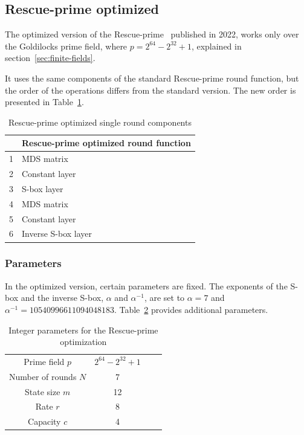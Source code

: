 \subsection*{Rescue-prime optimized}
The optimized version of the Rescue-prime~\cite{ashur2022rescue} published in 2022, works only over the Goldilocks prime field, where $p = 2^{64} - 2^{32} + 1$, explained in section~\ref{sec:finite-fields}.

It uses the same components of the standard Rescue-prime round function, but the order of the operations differs from the standard version. The new order is presented in Table~\ref{tab:rescue-opt-round-comp}. 

\begin{table}[htbp]
    \centering
    \begin{tabular}{rl}
        \toprule
        & Rescue-prime optimized round function \\
        \midrule
        1 & MDS matrix \\
        2 & Constant layer \\
        3 & S-box layer \\
        4 & MDS matrix \\
        5 & Constant layer \\
        6 & Inverse S-box layer \\
        \bottomrule
    \end{tabular}
    \caption{Rescue-prime optimized single round components}
    \label{tab:rescue-opt-round-comp}
\end{table}

\subsubsection*{Parameters}
In the optimized version, certain parameters are fixed. The exponents of the S-box and the inverse S-box, $\alpha$ and $\alpha^{-1}$, are set to $\alpha = 7$ and $\alpha^{-1} = 10540996611094048183$. Table~\ref{tab:rescue-param-opt} provides additional parameters.

\begin{table}[htbp]
    \centering
    \begin{tabular}{cccc}
      \toprule
      Prime field $p$ & $2^{64} - 2^{32} + 1$  \\
      Number of rounds $N$  & 7   \\
      State size $m$       & 12   \\
      Rate $r$       & 8          \\
      Capacity $c$  & 4           \\
      \bottomrule
    \end{tabular}
    \caption{Integer parameters for the Rescue-prime optimization}
    \label{tab:rescue-param-opt}
  \end{table}

